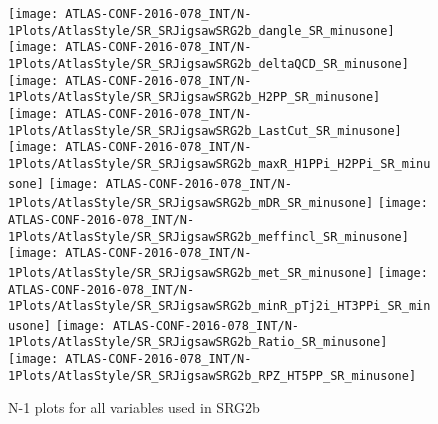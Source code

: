 \begin{figure}[tbp]
\begin{center}
\texttt{[image: ATLAS-CONF-2016-078\_INT/N-1Plots/AtlasStyle/SR\_SRJigsawSRG2b\_dangle\_SR\_minusone]}
\texttt{[image: ATLAS-CONF-2016-078\_INT/N-1Plots/AtlasStyle/SR\_SRJigsawSRG2b\_deltaQCD\_SR\_minusone]}
\texttt{[image: ATLAS-CONF-2016-078\_INT/N-1Plots/AtlasStyle/SR\_SRJigsawSRG2b\_H2PP\_SR\_minusone]}
\texttt{[image: ATLAS-CONF-2016-078\_INT/N-1Plots/AtlasStyle/SR\_SRJigsawSRG2b\_LastCut\_SR\_minusone]}
\texttt{[image: ATLAS-CONF-2016-078\_INT/N-1Plots/AtlasStyle/SR\_SRJigsawSRG2b\_maxR\_H1PPi\_H2PPi\_SR\_minusone]}
\texttt{[image: ATLAS-CONF-2016-078\_INT/N-1Plots/AtlasStyle/SR\_SRJigsawSRG2b\_mDR\_SR\_minusone]}
\texttt{[image: ATLAS-CONF-2016-078\_INT/N-1Plots/AtlasStyle/SR\_SRJigsawSRG2b\_meffincl\_SR\_minusone]}
\texttt{[image: ATLAS-CONF-2016-078\_INT/N-1Plots/AtlasStyle/SR\_SRJigsawSRG2b\_met\_SR\_minusone]}
\texttt{[image: ATLAS-CONF-2016-078\_INT/N-1Plots/AtlasStyle/SR\_SRJigsawSRG2b\_minR\_pTj2i\_HT3PPi\_SR\_minusone]}
\texttt{[image: ATLAS-CONF-2016-078\_INT/N-1Plots/AtlasStyle/SR\_SRJigsawSRG2b\_Ratio\_SR\_minusone]}
\texttt{[image: ATLAS-CONF-2016-078\_INT/N-1Plots/AtlasStyle/SR\_SRJigsawSRG2b\_RPZ\_HT5PP\_SR\_minusone]}
\end{center}
\caption{N-1 plots for all variables used in SRG2b}
\label{fig:SR_SRJigsawSRG2b_deltaQCD_SR_minusone}
\end{figure}

